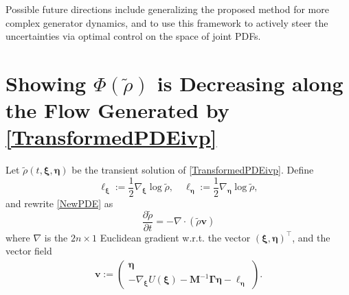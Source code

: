 \documentclass[10pt,twocolumn]{IEEEtran}
\begin{document}
Possible future directions include generalizing the proposed method for more complex generator dynamics, and to use this framework to actively steer the uncertainties via optimal control on the space of joint PDFs. 


\appendices
\section{Showing $\Phi(\tilde{\rho})$ is Decreasing along the Flow Generated by \eqref{TransformedPDEivp}}\label{AppLyap}
Let $\tilde{\rho}(t,\bm{\xi},\bm{\eta})$ be the transient solution of \eqref{TransformedPDEivp}. Define
$$\bm{\ell}_{\bm{\xi}} := \frac{1}{2}\nabla_{\bm{\xi}}\log\tilde{\rho}, \quad \bm{\ell}_{\bm{\eta}} := \frac{1}{2}\nabla_{\bm{\eta}}\log\tilde{\rho},$$
and rewrite \eqref{NewPDE} as
$$\dfrac{\partial\tilde{\rho}}{\partial t} = - \nabla\cdot\left(\tilde{\rho}\bm{v}\right)$$
where $\nabla$ is the $2n\times 1$ Euclidean gradient w.r.t. the vector $(\bm{\xi},\bm{\eta})^{\top}$, and the vector field
\begin{align}
\bm{v} := \begin{pmatrix}
 \bm{\eta}\\
 -\nabla_{\bm{\xi}}U(\bm{\xi}) - \bm{M}^{-1}\bm{\Gamma}\bm{\eta} - \bm{\ell}_{\bm{\eta}}	
 \end{pmatrix}.
\label{defvectorfieldv}	
\end{align}
\end{document}

